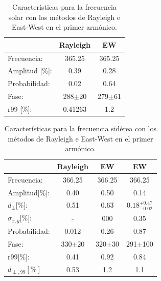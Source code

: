     \begin{table}[H]
        \begin{small}
            \begin{center}
                \begin{tabular}[c]{l|c|c}
                                    & Rayleigh      & EW            \\\hline
                    Frecuencia:     & 365.25	    & 365.25        \\
                    Amplitud [\%]:  & 0.39          & 0.28       \\
                    Probabilidad:   & 0.02          & 0.64          \\
                    Fase:           & 288$\pm$20    & 279$\pm$61    \\
                    r99 [\%]:       & 0.41263       & 1.2       \\
                \end{tabular}
            \end{center}
        \end{small}
        \caption{Características para la frecuencia solar con los métodos de Rayleigh  e East-West en el primer armónico.}
        \label{tab:solar_3}
    \end{table}

    \begin{table}[H]
        \begin{small}
            \begin{center}
                \begin{tabular}[c]{l|c||c|c}
                                    & Rayleigh     & EW         & EW\cite{Aab_2020}      \\\hline
                    Frecuencia:     & 366.25	   & 366.25     & 366.25        \\
                    Amplitud[\%]:   & 0.40	       & 0.50       & 0.14\footnotemark[2]      \\
                    $d_\perp$[\%]:  & 0.51         & 0.63      & $0.18 ^{+0.47}_{-0.02}$       \\ 
                    $\sigma_{x,y}$[\%]: & -	       & 000	    & 0.35          \\
                    Probabilidad:   & 0.012	       & 0.26       & 0.87          \\
                    Fase:           & 330$\pm$20   & 320$\pm$30 & 291$\pm$100 \footnotemark[3]     \\
                    r99[\%]:           & 0.41	   & 0.92    & 0.84\footnotemark[2]       \\
                    $d_{\perp,99}[\%]$ & 0.53      & 1.2     & 1.1        \\
                \end{tabular}
            \end{center}
        \end{small}
        \caption{Características para la frecuencia sidérea con los métodos de Rayleigh  e East-West en el primer armónico.}
        \label{tab:siderea_3}
    \end{table}
   

